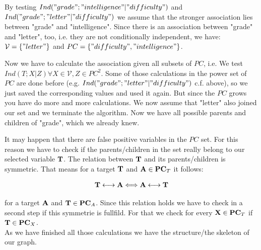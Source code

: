 			 \label{img.firstSelected}

			By testing $Ind("grade"; "intelligence" | "difficulty")$ and $Ind("grade"; "letter" | "difficulty")$ we assume that the stronger association lies between "grade" and "intelligence". Since there is an association between "grade" and "letter", too, i.e. they are not conditionally independent, we have: $\mathcal{V} = \{"letter"\}$ and $PC = \{"difficulty", "intelligence"\}$.

			 \label{img.secondSelected}

			Now we have to calculate the association given all subsets of $PC$, i.e. We test $Ind(T; X | Z) \forall X \in \mathcal{V}, Z \in PC^{2}$. Some of those calculations in the power set of $PC$ are done before (e.g. $Ind("grade"; "letter" | "difficulty")$ c.f. above), so we just saved the corresponding values and used it again. But since the $PC$ grows you have do more and more calculations. We now assume that "letter" also joined our set and we terminate the algorithm. Now we have all possible parents and children of "grade", which we already knew.

			 \label{img.thirdSelected}

			It may happen that there are false positive variables in the $PC$ set. For this reason we have to check if the parents/children in the set really belong to our selected variable ${\textbf{T}}$. The relation between ${\textbf{T}}$ and its parents/children is symmetric. That means for a target ${\textbf{T}}$ and ${\textbf{A}} \in {\textbf{PC}}_{T}$ it follows:

			\begin{equation}
				{\textbf{T}} \longleftrightarrow {\textbf{A}} \Longleftrightarrow {\textbf{A}} \longleftrightarrow {\textbf{T}} \label{eq.symmetric}
			\end{equation}

			for a target ${\textbf{A}}$ and ${\textbf{T}} \in {\textbf{PC}}_{A}$. Since this relation holds we have to check in a second step if this symmetrie is fullfild. For that we check for every ${\textbf{X}} \in {\textbf{PC}}_{T}$ if ${\textbf{T}} \in {\textbf{PC}}_{X}$.\\

			As we have finished all those calculations we have the structure/the skeleton of our graph.
			

